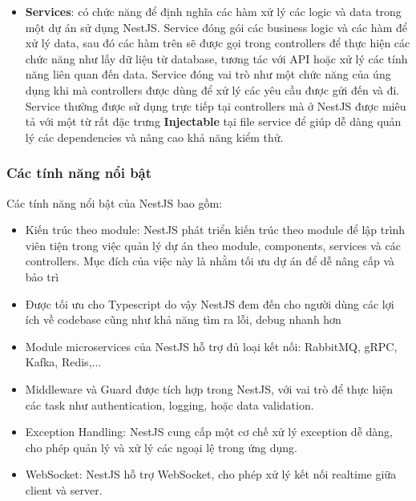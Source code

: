 \begin{itemize}
    \item \textbf{Services}: có chức năng để định nghĩa các hàm xử lý các logic và data trong một dự án sử dụng NestJS. Service đóng gói các business logic và các hàm để xử lý data, sau đó các hàm trên sẽ được gọi trong controllers để thực hiện các chức năng như lấy dữ liệu từ database, tương tác với API hoặc xử lý các tính năng liên quan đến data. Service đóng vai trò như một chức năng của úng dụng khi mà controllers được dùng để xử lý các yêu cầu được gửi đến và đi. Service thường được sử dụng trực tiếp tại controllers mà ở NestJS được miêu tả với một từ rất đặc trưng \textbf{Injectable} tại file service để giúp dễ dàng quản lý các dependencies và nâng cao khả năng kiểm thử.
\end{itemize}
\subsubsection{Các tính năng nổi bật}
Các tính năng nổi bật của NestJS bao gồm:
\begin{itemize}
    \item Kiến trúc theo module: NestJS phát triển kiến trúc theo module để lập trình viên tiện trong việc quản lý dự án theo module, components, services và các controllers. Mục đích của việc này là nhằm tối ưu dự án để dễ nâng cấp và bảo trì
    \item Được tối ưu cho Typescript do vậy NestJS đem đến cho người dùng các lợi ích về codebase cũng như khả năng tìm ra lỗi, debug nhanh hơn
    \item Module microservices của NestJS hỗ trợ đủ loại kết nối: RabbitMQ, gRPC, Kafka, Redis,...
    \item Middleware và Guard được tích hợp trong NestJS, với vai trò để thực hiện các task như authentication, logging, hoặc data validation.
    \item Exception Handling: NestJS cung cấp một cơ chế xử lý exception dễ dàng, cho phép quản lý và xử lý các ngoại lệ trong ứng dụng.
    \item WebSocket: NestJS hỗ trợ WebSocket, cho phép xử lý kết nối realtime giữa client và server.
\end{itemize}
